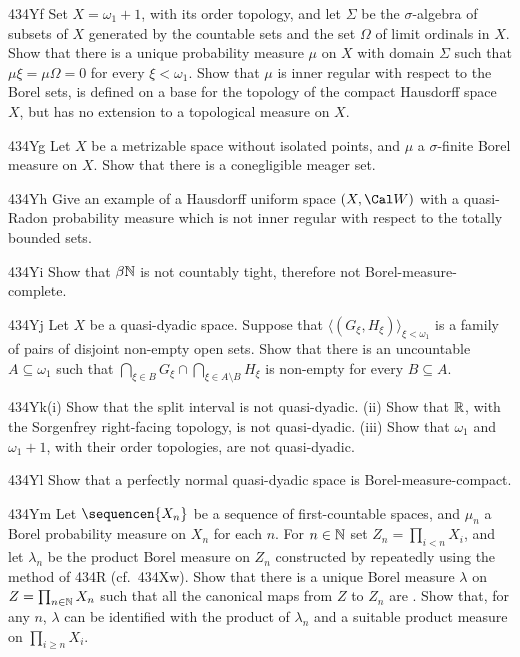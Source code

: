 {\spheader 434Yf Set $X=\omega_1+1$, with its order topology, and let
$\Sigma$ be the $\sigma$-algebra of subsets of $X$ generated by the
countable sets and the set $\Omega$ of limit ordinals in $X$.   Show
that there is a unique probability measure $\mu$ on $X$ with domain
$\Sigma$ such that $\mu\xi=\mu\Omega=0$ for every $\xi<\omega_1$.   Show
that $\mu$ is inner regular with respect to the Borel sets, is defined
on a base for the topology of the compact Hausdorff space $X$, but has
no extension to a topological measure on $X$.

\spheader 434Yg Let $X$ be a metrizable space without isolated points,
and $\mu$ a $\sigma$-finite Borel measure on $X$.   Show
that there is a conegligible meager set.   

\spheader 434Yh Give an example of a Hausdorff uniform space $(X,\Cal W)$ 
with a quasi-Radon probability measure which is not inner regular with
respect to the totally bounded sets.

\spheader 434Yi Show that $\beta\Bbb N$ is not countably tight,
therefore not Borel-measure-complete.

\spheader 434Yj Let $X$ be a quasi-dyadic space.   Suppose that
$\langle(G_{\xi},H_{\xi})\rangle_{\xi<\omega_1}$ is a family of pairs of
disjoint non-empty open sets.   Show that there is an uncountable
$A\subseteq\omega_1$ such that $\bigcap_{\xi\in
B}G_{\xi}\cap\bigcap_{\xi\in A\setminus B}H_{\xi}$ is non-empty for
every $B\subseteq A$.   

\spheader 434Yk(i) Show that the split interval is not quasi-dyadic.
(ii) Show that $\Bbb R$, with the Sorgenfrey right-facing topology, is
not quasi-dyadic.   (iii) Show that $\omega_1$ and $\omega_1+1$, with
their order topologies, are not quasi-dyadic.   

\spheader 434Yl Show that a perfectly normal quasi-dyadic space is
Borel-measure-compact.

\spheader 434Ym Let $\sequencen{X_n}$ be a sequence of first-countable
spaces, and $\mu_n$ a Borel probability measure on $X_n$ for each $n$.   
For $n\in\Bbb N$ set $Z_n=\prod_{i<n}X_i$, and let $\lambda_n$ be the
product Borel measure on $Z_n$ constructed by repeatedly using the
method of 434R (cf.\ 434Xw).   Show that there is a unique Borel measure
$\lambda$ on $Z=\prod_{n\in\Bbb N}X_n$ such that all the canonical maps
from $Z$ to $Z_n$ are \imp.   Show that, for any $n$, $\lambda$ can be
identified with the product of $\lambda_n$ and a suitable product
measure on $\prod_{i\ge n}X_i$.

}
